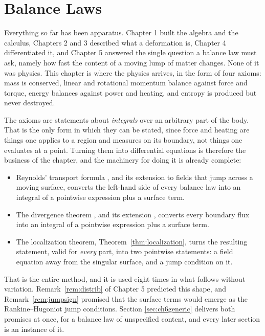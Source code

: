 \chapter{Balance Laws}

Everything so far has been apparatus. Chapter 1 built the algebra and
the calculus, Chapters 2 and 3 described what a deformation is, Chapter
4 differentiated it, and Chapter 5 answered the single question a
balance law must ask, namely how fast the content of a moving lump of
matter changes. None of it was physics. This chapter is where the
physics arrives, in the form of four axioms: mass is conserved, linear
and rotational momentum balance against force and torque, energy
balances against power and heating, and entropy is produced but never
destroyed.

The axioms are statements about \emph{integrals} over an arbitrary part
of the body. That is the only form in which they can be stated, since
force and heating are things one applies to a region and measures on
its boundary, not things one evaluates at a point. Turning them into
differential equations is therefore the business of the chapter, and
the machinery for doing it is already complete:

\begin{itemize}\itemsep2pt
\item Reynolds' transport formula , and its extension
       to fields that jump across a moving surface, converts
      the left-hand side of every balance law into an integral of a
      pointwise expression plus a surface term.
\item The divergence theorem , and its extension ,
      converts every boundary flux into an integral of a pointwise
      expression plus a surface term.
\item The localization theorem, Theorem~\ref{thm:localization}, turns
      the resulting statement, valid for \emph{every} part, into two
      pointwise statements: a field equation away from the singular
      surface, and a jump condition on it.
\end{itemize}

That is the entire method, and it is used eight times in what follows
without variation. Remark~\ref{rem:distrib} of Chapter 5 predicted this
shape, and Remark~\ref{rem:jumpsign} promised that the surface terms
would emerge as the Rankine--Hugoniot jump conditions. Section
\ref{sec:ch6generic} delivers both promises at once, for a balance law
of unspecified content, and every later section is an instance of it.

